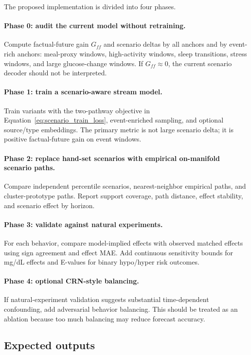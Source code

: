 The proposed implementation is divided into four phases.

\paragraph{Phase 0: audit the current model without retraining.}
Compute factual-future gain $G_{ff}$ and scenario deltas by all anchors and by event-rich anchors: meal-proxy windows, high-activity windows, sleep transitions, stress windows, and large glucose-change windows. If $G_{ff}\approx 0$, the current scenario decoder should not be interpreted.

\paragraph{Phase 1: train a scenario-aware stream model.}
Train variants with the two-pathway objective in Equation~\eqref{eq:scenario_train_loss}, event-enriched sampling, and optional source/type embeddings. The primary metric is not large scenario delta; it is positive factual-future gain on event windows.

\paragraph{Phase 2: replace hand-set scenarios with empirical on-manifold scenario paths.}
Compare independent percentile scenarios, nearest-neighbor empirical paths, and cluster-prototype paths. Report support coverage, path distance, effect stability, and scenario effect by horizon.

\paragraph{Phase 3: validate against natural experiments.}
For each behavior, compare model-implied effects with observed matched effects using sign agreement and effect MAE. Add continuous sensitivity bounds for mg/dL effects and E-values for binary hypo/hyper risk outcomes.

\paragraph{Phase 4: optional CRN-style balancing.}
If natural-experiment validation suggests substantial time-dependent confounding, add adversarial behavior balancing. This should be treated as an ablation because too much balancing may reduce forecast accuracy.

\subsection{Expected outputs}
\label{subsec:cf_expected_outputs}

